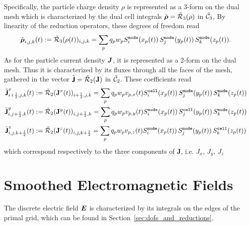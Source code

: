 \documentclass[11pt]{article}
\newcommand{\cell}{\texttt{cell}}
\newcommand{\node}{\texttt{node}}
\begin{document}
Specifically, the particle charge density $\rho$ is represented as a 3-form on the dual mesh which is 
characterized by the dual cell integrals $\tilde{{\boldsymbol {\rm \mathsf{\rho}}}} = \tilde{\mathcal{R}}_3(\rho)$ in $\tilde{ \mathcal{C}}_3$,
By linearity of the reduction operators, these degrees of freedom %
read
$$
\tilde{\arr{\rho}}_{i,j,k}(t) := \tcR_3(\rho(t))_{i,j,k}
= \sum_p q_p w_p S^\node_i(x_p(t))\, S^\node_j(y_p(t)) \,S^\node_k(z_p(t)).
$$
As for the particle current density ${\boldsymbol J}$, it is represented as a 2-form on the dual mesh. 
Thus it is characterized 
by its fluxes through all the faces of the mesh, gathered in the vector 
$\tilde{{\boldsymbol {\rm \mathsf{J}}}} = \tilde{\mathcal{R}}_2( \mathbf{J})$ in $\tilde{ \mathcal{C}}_2$. These coefficients read
$$
\begin{aligned}
\tilde{\arrJ}^{x}_{\iph,j,k}(t) &:= \tcR_2( \mathbf{J}^{x}(t))_{\iph,j,k} = \sum_p q_p w_p v_{p,x}(t) S^\cell_i(x_p(t))\, S^\node_j(y_p(t)) \,S^\node_k(z_p(t)) \\ 
\tilde{\arrJ}^{y}_{i,\jph,k}(t) &:= \tcR_2( \mathbf{J}^{y}(t))_{i,\jph,k} =\sum_p q_p w_p v_{p,y}(t) S^\node_i(x_p(t))\, S^\cell_j(y_p(t)) \,S^\node_k(z_p(t)) \\
\tilde{\arrJ}^{z}_{i,j,\kph}(t) &:= \tcR_2( \mathbf{J}^{z}(t))_{i,j,\kph} = \sum_p q_p w_p v_{p,z}(t) S^\node_i(x_p(t))\, S^\node_j(y_p(t)) \,S^\cell_k(z_p(t)) \\
\end{aligned}
$$
which correspond respectively to the three components of $\mathbf{J}$, i.e.  $J_x$, $J_y$, $J_z$ 

\section{Smoothed Electromagnetic Fields}

The discrete electric field ${\boldsymbol E}$ is characterized by its integrals on the edges of the primal grid, which can be found 
in Section~\ref{sec:dofs_and_reductions}.
\end{document}
